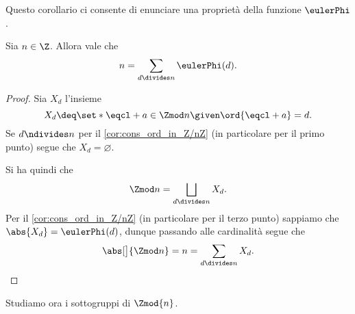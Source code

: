 Questo corollario ci consente di enunciare una proprietà della funzione $\eulerPhi$.

\begin{corollary}
    Sia $n \in \Z$. Allora vale che \[
        n = \sum_{d \divides n} \eulerPhi(d).    
    \]
\end{corollary}
\begin{proof}
    Sia $X_d$ l'insieme \[
        X_d \deq \set*{\eqcl+ a \in \Zmod n \given \ord{\eqcl+ a} = d}.    
    \]
    Se $d \ndivides n$ per il \autoref{cor:cons_ord_in_Z/nZ} (in particolare per il primo punto) segue che $X_d = \varnothing$.

    Si ha quindi che \[
        \Zmod n = \bigsqcup_{d \divides n} X_d.  
    \] Per il \autoref{cor:cons_ord_in_Z/nZ} (in particolare per il terzo punto) sappiamo che $\abs{X_d} = \eulerPhi(d)$, dunque passando alle cardinalità segue che \[
        \abs[\big]{\Zmod n} = n = \sum_{d \divides n} X_d. \qedhere
    \]
\end{proof}

Studiamo ora i sottogruppi di $\Zmod{n}$.

